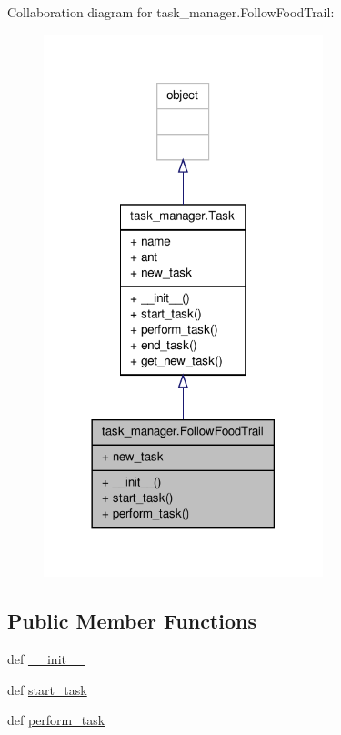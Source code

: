 Collaboration diagram for task\+\_\+manager.\+Follow\+Food\+Trail\+:\nopagebreak
\begin{figure}[H]
\begin{center}
\leavevmode
\includegraphics[width=230pt]{classtask__manager_1_1FollowFoodTrail__coll__graph}
\end{center}
\end{figure}
\subsection*{Public Member Functions}
\begin{DoxyCompactItemize}
\item 
def \hyperlink{classtask__manager_1_1FollowFoodTrail_a6af05bfd09141281c9943c8f01a0896b}{\+\_\+\+\_\+init\+\_\+\+\_\+}
\item 
def \hyperlink{classtask__manager_1_1FollowFoodTrail_a68013dbb3ab9d25676217de4d22c48eb}{start\+\_\+task}
\item 
def \hyperlink{classtask__manager_1_1FollowFoodTrail_aa805a2a4e9a76ba7afa252ca5efbd121}{perform\+\_\+task}
\end{DoxyCompactItemize}
